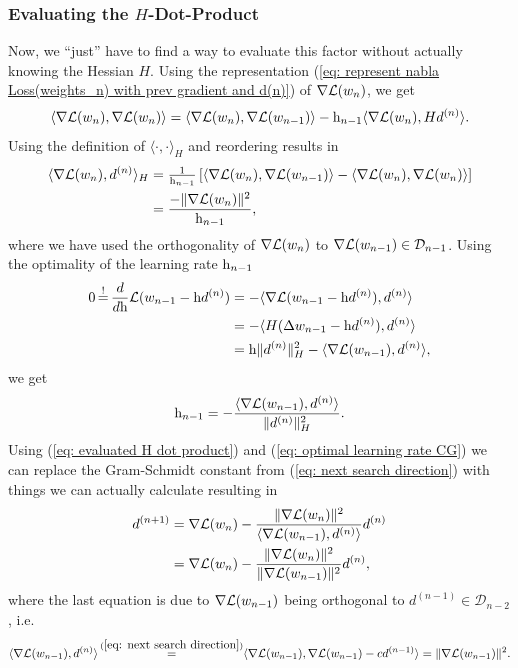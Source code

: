 \subsubsection{Evaluating the \(H\)-Dot-Product}

Now, we ``just'' have to find a way to evaluate this factor without actually
knowing the Hessian \(H\). Using the representation (\ref{eq: represent nabla Loss(weights_n) with
prev gradient and d(n)}) of \(\nabla\mathcal{L}(w_n)\), we get
\begin{align*}
	\langle \nabla\mathcal{L}(w_n), \nabla\mathcal{L}(w_n) \rangle
	= \langle \nabla\mathcal{L}(w_n), \nabla\mathcal{L}(w_{n-1}) \rangle
	- \text{h}_{n-1}\langle \nabla\mathcal{L}(w_n), H d^{(n)}\rangle.
\end{align*}
Using the definition of \(\langle\cdot,\cdot\rangle_H\) and reordering results in
\begin{align}
	\nonumber
	\langle \nabla\mathcal{L}(w_n), d^{(n)}\rangle_H
	&= \tfrac1{\text{h}_{n-1}}\left[
		\langle \nabla\mathcal{L}(w_n), \nabla\mathcal{L}(w_{n-1}) \rangle
		- \langle \nabla\mathcal{L}(w_n), \nabla\mathcal{L}(w_n) \rangle
	\right]\\
	\label{eq: evaluated H dot product}
	&= \frac{- \|\nabla\mathcal{L}(w_n)\|^2}{\text{h}_{n-1}},
\end{align}
where we have used the orthogonality of \(\nabla\mathcal{L}(w_n)\) to
\(\nabla\mathcal{L}(w_{n-1})\in\mathcal{D}_{n-1}\).
Using the optimality of the learning rate \(\text{h}_{n-1}\)
\begin{align*}
	0\xeq{!}\frac{d}{d\lr}\Loss(\weights_{n-1} - \lr d^{(n)})
	&= -\langle \nabla\Loss(\weights_{n-1} - \lr d^{(n)}), d^{(n)} \rangle\\
	&= -\langle H(\Delta\weights_{n-1} -\lr d^{(n)}), d^{(n)} \rangle\\
	&= \lr\|d^{(n)}\|_H^2 - \langle \nabla\Loss(\weights_{n-1}), d^{(n)}\rangle,
\end{align*}
we get
\begin{align}\label{eq: optimal learning rate CG}
	\text{h}_{n-1}
	= - \frac{\langle \nabla\mathcal{L}(w_{n-1}), d^{(n)}\rangle}{\|d^{(n)}\|_H^2}.
\end{align}
Using (\ref{eq: evaluated H dot product}) and (\ref{eq: optimal learning rate CG})
we can replace the Gram-Schmidt constant from (\ref{eq: next search direction})
with things we can actually calculate resulting in
\begin{align*}
	d^{(n+1)}
	&= \nabla\mathcal{L}(w_n)
	- \frac{
		\|\nabla\mathcal{L}(w_n)\|^2
	}{\langle \nabla\mathcal{L}(w_{n-1}), d^{(n)}\rangle}d^{(n)}\\
	&= \nabla\mathcal{L}(w_n)
	- \frac{\|\nabla\mathcal{L}(w_n)\|^2}{\|\nabla\mathcal{L}(w_{n-1})\|^2}
	d^{(n)},
\end{align*}
where the last equation is due to \(\nabla\mathcal{L}(w_{n-1})\) being orthogonal
to \(d^{(n-1)}\in\mathcal{D}_{n-2}\), i.e.
\begin{align*}
	\langle \nabla\Loss(\weights_{n-1}), d^{(n)} \rangle
	\xeq{(\ref{eq: next search direction})} 
	\langle \nabla\Loss(\weights_{n-1}),\nabla\Loss(\weights_{n-1}) - c d^{(n-1)}\rangle
	= \|\nabla\Loss(\weights_{n-1})\|^2.
\end{align*}


